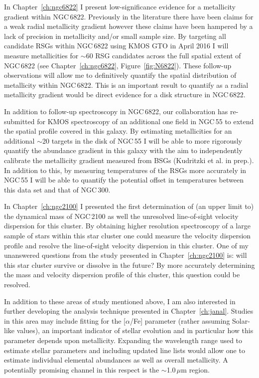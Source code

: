 In Chapter~\ref{ch:ngc6822} I present low-significance evidence for a metallicity gradient within NGC\,6822. Previously in the literature there have been claims for a weak radial metallicity gradient however these claims have been hampered by a lack of precision in metallicity and/or small sample size.
By targeting all candidate RSGs within NGC\,6822 using KMOS GTO in April 2016 I will measure metallicities for $\sim$60 RSG candidates across the full spatial extent of NGC\,6822 (see Chapter~\ref{ch:ngc6822}, Figure~\ref{fig:N6822}).
These follow-up observations will allow me to definitively quantify the spatial distribution of metallicity within NGC\,6822.
This is an important result to quantify as a radial metallicity gradient would be direct evidence for a disk structure in NGC\,6822.

In addition to follow-up spectroscopy in NGC\,6822, our collaboration has re-submitted for KMOS spectroscopy of an additional one field in NGC\,55 to extend the spatial profile covered in this galaxy.
By estimating metallicities for an additional $\sim$20 targets in the disk of NGC\,55 I will be able to more rigorously quantify the abundance gradient in this galaxy with the aim to independently calibrate the metallicity gradient measured from BSGs (Kudritzki et al. in prep.).
In addition to this, by measuring temperatures of the RSGs more accurately in NGC\,55 I will be able to quantify the potential offset in temperatures between this data set and that of NGC\,300.

In Chapter~\ref{ch:ngc2100} I presented the first determination of (an upper limit to) the dynamical mass of NGC\,2100 as well the unresolved line-of-sight velocity dispersion for this cluster.
By obtaining higher resolution spectroscopy of a large sample of stars within this star cluster one could measure the velocity dispersion profile and resolve the line-of-sight velocity dispersion in this cluster.
One of my unanswered questions from the study presented in Chapter~\ref{ch:ngc2100} is: will this star cluster survive or dissolve in the future?
By more accurately determining the mass and velocity dispersion profile of this cluster, this question could be resolved.


In addition to these areas of study mentioned above, I am also interested in further developing the analysis technique presented in Chapter~\ref{ch:janal}.
Studies in this area may include fitting for the [$\alpha$/Fe] parameter (rather assuming Solar-like values), an important indicator of stellar evolution and in particular how this parameter depends upon metallicity.
Expanding the wavelength range used to estimate stellar parameters and including updated line lists would allow one to estimate individual elemental abundances as well as overall metallicity.
A potentially promising channel in this respect is the $\sim$1.0\,$\mu$m region.

